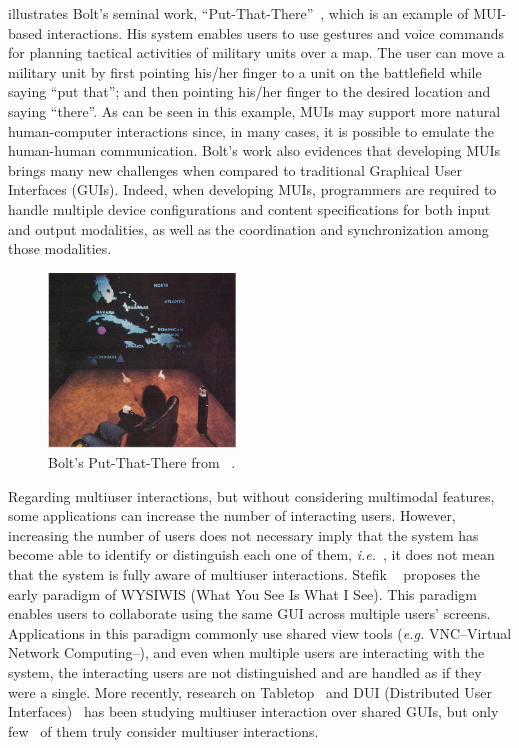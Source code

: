  illustrates Bolt’s seminal work,
“Put-That-There”~\cite{bolt_put-that-there:_1980}, which is an example of
MUI-based interactions.
His system enables users to use gestures and voice commands for planning
tactical activities of military units over a map. The user can move a military
unit by first pointing his/her finger to a unit on the battlefield while saying
“put that”; and then pointing his/her finger to the desired location and saying
“there”. As can be seen in this example, MUIs may support more natural
human-computer interactions since, in many cases, it is possible to emulate the
human-human communication. Bolt’s work also evidences that developing MUIs
brings many new challenges when compared to traditional Graphical User
Interfaces (GUIs). Indeed, when developing MUIs, programmers are required to
handle multiple device configurations and content specifications for both input
and output modalities, as well as the coordination and synchronization among
those modalities.

\begin{figure}[!ht]
\begin{center}
	\includegraphics[width=5cm, keepaspectratio]{img/img1.png}
	\caption[Bolt's Put-That-There]{Bolt's Put-That-There from
	~\cite{turk_multimodal_2014}.}
	\label{fig:bolt}
    \captionvspace
\end{center}
\end{figure}

Regarding multiuser interactions, but without considering multimodal features,
some applications can increase the number of interacting users. However,
increasing the number of users does not necessary imply that the system has
become able to identify or distinguish each one of them, \textit{i.e.}~, it does not mean
that the system is fully aware of multiuser interactions. Stefik
~\cite{stefik_wysiwis_1987} proposes the early paradigm of WYSIWIS (What You See
Is What I See). This paradigm enables users to collaborate using the same GUI
across multiple users’ screens. Applications in this paradigm commonly use
shared view tools (\textit{e.g.} VNC--Virtual Network Computing--), and even when multiple users are interacting with
the system, the interacting users are not distinguished and are handled as if they were a single. More recently, research on
Tabletop~\cite{muller-tomfelde_introduction:_2010} and DUI (Distributed
User Interfaces)~\cite{elmqvist_distributed_2011} has been studying multiuser
interaction over shared GUIs, but only few~\cite{dietz_diamondtouch:_2001} of
them truly consider multiuser interactions.

